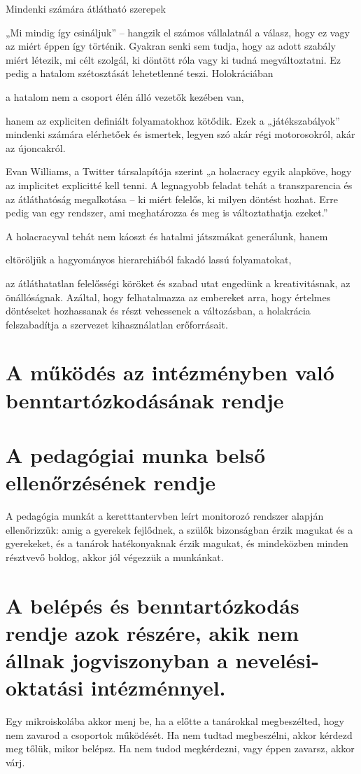 Mindenki számára átlátható szerepek

„Mi mindig így csináljuk” – hangzik el számos vállalatnál a válasz, hogy ez vagy az miért éppen így történik. Gyakran senki sem tudja, hogy az adott szabály miért létezik, mi célt szolgál, ki döntött róla vagy ki tudná megváltoztatni. Ez pedig a hatalom szétosztását lehetetlenné teszi. Holokráciában

a hatalom nem a csoport élén álló vezetők kezében van,

hanem az expliciten definiált folyamatokhoz kötődik. Ezek a „játékszabályok” mindenki számára elérhetőek és ismertek, legyen szó akár régi motorosokról, akár az újoncakról.

Evan Williams, a Twitter társalapítója szerint „a holacracy egyik alapköve, hogy az implicitet explicitté kell tenni. A legnagyobb feladat tehát a transzparencia és az átláthatóság megalkotása – ki miért felelős, ki milyen döntést hozhat. Erre pedig van egy rendszer, ami meghatározza és meg is változtathatja ezeket.”

A holacracyval tehát nem káoszt és hatalmi játszmákat generálunk, hanem

eltöröljük a hagyományos hierarchiából fakadó lassú folyamatokat,

az átláthatatlan felelősségi köröket és szabad utat engedünk a kreativitásnak, az önállóságnak. Azáltal, hogy felhatalmazza az embereket arra, hogy értelmes döntéseket hozhassanak és részt vehessenek a változásban, a holakrácia felszabadítja a szervezet kihasználatlan erőforrásait.



\section{A működés az intézményben való benntartózkodásának rendje}
\section{A pedagógiai munka belső ellenőrzésének rendje}
A pedagógia munkát a keretttantervben leírt monitorozó rendszer alapján ellenőrizzük: amig a gyerekek fejlődnek, a szülők bizonságban érzik magukat és a gyerekeket, és a tanárok hatékonyaknak érzik magukat, és mindeközben minden résztvevő boldog, akkor jól végezzük a munkánkat.

\section{A belépés és benntartózkodás rendje azok részére, akik nem állnak jogviszonyban a nevelési-oktatási intézménnyel.}
Egy mikroiskolába akkor menj be, ha a előtte a tanárokkal megbeszélted, hogy nem zavarod a csoportok működését. Ha nem tudtad megbeszélni, akkor kérdezd meg tőlük, mikor belépsz. Ha nem tudod megkérdezni, vagy éppen zavarsz, akkor várj.


